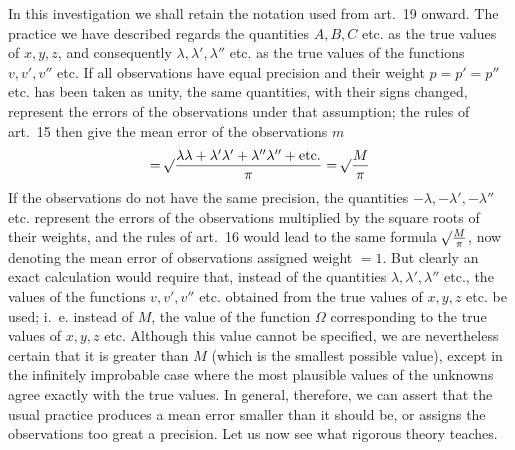 In this investigation we shall retain the notation used from art.\ 19 onward. The practice we have described regards the quantities \(A,B,C\) etc. as the true values of \(x,y,z\), and consequently \(\lambda,\lambda',\lambda''\) etc. as the true values of the functions \(v,v',v''\) etc. If all observations have equal precision and their weight \(p=p'=p''\) etc. has been taken as unity, the same quantities, with their signs changed, represent the errors of the observations under that assumption; the rules of art.\ 15 then give the mean error of the observations \(m\)
\[
=\mathord{{}^{}\!\surd}\frac{\lambda\lambda+\lambda'\lambda'+\lambda''\lambda''+\text{etc.}}{\pi}=\mathord{{}^{}\!\surd}\frac{M}{\pi}
\]
If the observations do not have the same precision, the quantities \(-\lambda,-\lambda',-\lambda''\) etc. represent the errors of the observations multiplied by the square roots of their weights, and the rules of art.\ 16 would lead to the same formula \(\mathord{{}^{}\!\surd}\frac{M}{\pi}\), now denoting the mean error of observations assigned weight \(=1\). But clearly an exact calculation would require that, instead of the quantities \(\lambda,\lambda',\lambda''\) etc., the values of the functions \(v,v',v''\) etc. obtained from the true values of \(x,y,z\) etc. be used; i.\ e. instead of \(M\), the value of the function \(\Omega\) corresponding to the true values of \(x,y,z\) etc. Although this value cannot be specified, we are nevertheless certain that it is greater than \(M\) (which is the smallest possible value), except in the infinitely improbable case where the most plausible values of the unknowns agree exactly with the true values. In general, therefore, we can assert that the usual practice produces a mean error smaller than it should be, or assigns the observations too great a precision. Let us now see what rigorous theory teaches.

